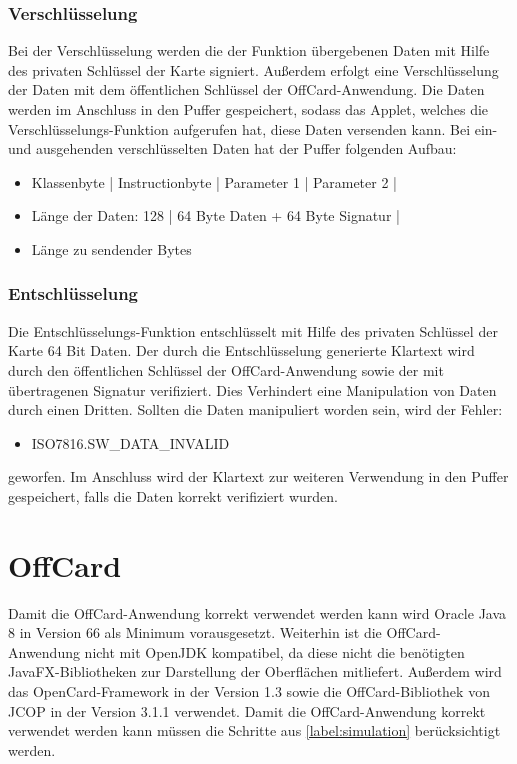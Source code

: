 \subsubsection{Verschlüsselung}
Bei der Verschlüsselung werden die der Funktion übergebenen Daten mit Hilfe des privaten Schlüssel der Karte signiert.
Außerdem erfolgt eine Verschlüsselung der Daten mit dem öffentlichen Schlüssel der OffCard-Anwendung.
Die Daten werden im Anschluss in den Puffer gespeichert, sodass das Applet, welches die Verschlüsselungs-Funktion aufgerufen hat, diese Daten versenden kann.
Bei ein- und ausgehenden verschlüsselten Daten hat der Puffer folgenden Aufbau:
\begin{itemize}
	\item[] Klassenbyte | Instructionbyte | Parameter 1 | Parameter 2 |
	\item[] Länge der Daten: 128 | 64 Byte Daten + 64 Byte Signatur | 
	\item[] Länge zu sendender Bytes
\end{itemize}

\subsubsection{Entschlüsselung}
Die Entschlüsselungs-Funktion entschlüsselt mit Hilfe des privaten Schlüssel der Karte 64 Bit Daten.
Der durch die Entschlüsselung generierte Klartext wird durch den öffentlichen Schlüssel der OffCard-Anwendung sowie der mit übertragenen Signatur verifiziert.
Dies Verhindert eine Manipulation von Daten durch einen Dritten.
Sollten die Daten manipuliert worden sein, wird der Fehler:
\begin{itemize}
	\item ISO7816.SW\_DATA\_INVALID
\end{itemize}
geworfen. 
Im Anschluss wird der Klartext zur weiteren Verwendung in den Puffer gespeichert, falls die Daten korrekt verifiziert wurden.

\section{OffCard}

Damit die OffCard-Anwendung korrekt verwendet werden kann wird Oracle Java 8 in Version 66 als Minimum vorausgesetzt.
Weiterhin ist die OffCard-Anwendung nicht mit OpenJDK kompatibel, da diese nicht die benötigten JavaFX-Bibliotheken zur Darstellung der Oberflächen mitliefert.
Außerdem wird das OpenCard-Framework in der Version 1.3 sowie die OffCard-Bibliothek von JCOP in der Version 3.1.1 verwendet.
Damit die OffCard-Anwendung korrekt verwendet werden kann müssen die Schritte aus \autoref{label:simulation} berücksichtigt werden.

